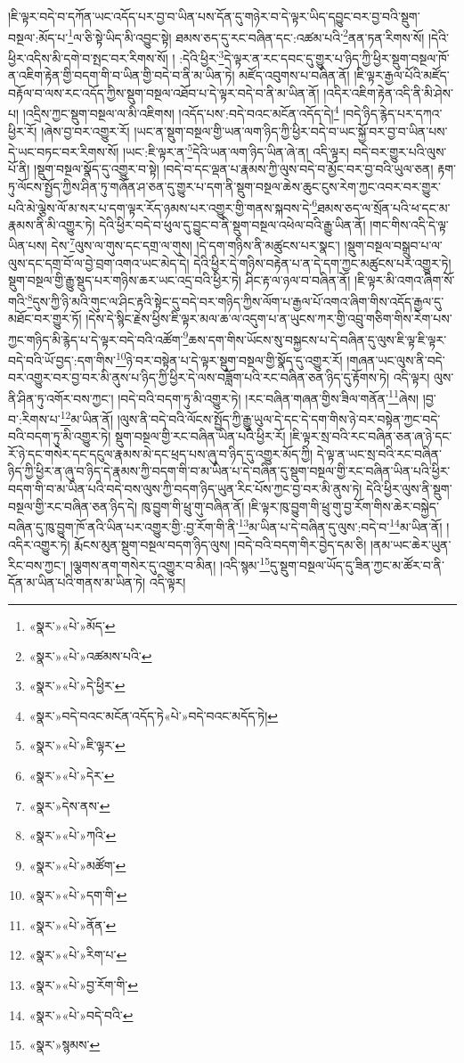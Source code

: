 །ཇི་ལྟར་བདེ་བ་དཀོན་ཡང་འདོད་པར་བྱ་བ་ཡིན་པས་དོན་དུ་གཉེར་བ་དེ་ལྟར་ཡིད་དབྱུང་བར་བྱ་བའི་སྡུག་བསྔལ་:མོད་པ་\footnote{«སྣར་»«པེ་»མོད་}ལ་ཅི་སྟེ་ཡིད་མི་འབྱུང་སྟེ། ཐམས་ཅད་དུ་རང་བཞིན་དང་:འཚམ་པའི་\footnote{«སྣར་»«པེ་»འཚམས་པའི་}ནན་ཏན་རིགས་སོ། །དེའི་ཕྱིར་འདིས་མི་དགེ་བ་སྤང་བར་རིགས་སོ། །
:དེའི་ཕྱིར་\footnote{«སྣར་»«པེ་»དེ་ཕྱིར་}དེ་ལྟར་ན་རང་དབང་དུ་གྱུར་པ་ཉིད་ཀྱི་ཕྱིར་སྡུག་བསྔལ་ཁོ་ན་འཇིག་རྟེན་གྱི་བདག་གི་བ་ཡིན་གྱི་བདེ་བ་ནི་མ་ཡིན་ཏེ། མཛོད་འབུགས་པ་བཞིན་ནོ། །ཇི་ལྟར་རྒྱལ་པོའི་མཛོད་བརྟོལ་བ་ལས་རང་འདོད་ཀྱིས་སྡུག་བསྔལ་འཐོབ་པ་དེ་ལྟར་བདེ་བ་ནི་མ་ཡིན་ནོ། །འདིར་འཇིག་རྟེན་འདི་ནི་མི་ཤེས་པ། །འདྲིས་ཀྱང་སྡུག་བསྔལ་ལ་མི་འཇིགས། །འདོད་པས་:བདེ་བའང་མངོན་འདོད་དེ།\footnote{«སྣར་»བདེ་བའང་མངོན་འདོད་ཏེ«པེ་»བདེ་བའང་མདོད་ཏེ།} །བདེ་ཉིད་རྙེད་པར་དཀའ་ཕྱིར་རོ། །ཞེས་བྱ་བར་འགྱུར་རོ། །ཡང་ན་སྡུག་བསྔལ་གྱི་ཡན་ལག་ཉིད་ཀྱི་ཕྱིར་བདེ་བ་ཡང་སྐྱོ་བར་བྱ་བ་ཡིན་པས་དེ་ཡང་བཏང་བར་རིགས་སོ། །ཡང་:ཇི་ལྟར་ན་\footnote{«སྣར་»«པེ་»ཇི་ལྟར་}དེའི་ཡན་ལག་ཉིད་ཡིན་ཞེ་ན། འདི་ལྟར། བདེ་བར་གྱུར་པའི་ལུས་པོ་ནི། །སྡུག་བསྔལ་སྣོད་དུ་འགྱུར་བ་སྟེ། །བདེ་བ་དང་ལྡན་པ་རྣམས་ཀྱི་ལུས་བདེ་བ་མྱོང་བར་བྱ་བའི་ཡུལ་ཅན། རྟག་ཏུ་ལོངས་སྤྱོད་ཀྱིས་ཤིན་ཏུ་གཞོན་ཤ་ཅན་དུ་གྱུར་པ་དག་ནི་སྡུག་བསྔལ་ཆེས་ཆུང་ངུས་རེག་ཀྱང་འབར་བར་གྱུར་པའི་མེ་ལྕེས་ལོ་མ་སར་པ་དག་ལྟར་རོད་ཉམས་པར་འགྱུར་གྱི་གནས་སྐབས་དེ་\footnote{«སྣར་»«པེ་»དེར་}ཐམས་ཅད་ལ་སྲོན་པའི་ཕ་དང་མ་རྣམས་ནི་མི་འགྱུར་ཏེ། དེའི་ཕྱིར་བདེ་བ་ཕུལ་དུ་བྱུང་བ་ནི་སྡུག་བསྔལ་འཕེལ་བའི་རྒྱུ་ཡིན་ནོ། །གང་གིས་འདི་དེ་ལྟ་ཡིན་པས། དེས་\footnote{«སྣར་»དེས་ནས་}ལུས་ལ་གུས་དང་དགྲ་ལ་གུས། །དེ་དག་གཉིས་ནི་མཚུངས་པར་སྣང་། །སྡུག་བསྔལ་བསྒྲུབ་པ་ལ་ལུས་དང་དགྲ་བོ་ལ་བྱེ་བྲག་འགའ་ཡང་མེད་དེ། དེའི་ཕྱིར་དེ་གཉིས་བརྟེན་པ་ན་དེ་དག་ཀྱང་མཚུངས་པར་འགྱུར་ཏེ། སྡུག་བསྔལ་གྱི་རྒྱུ་སྡུད་པར་གཉིས་ཆར་ཡང་འདྲ་བའི་ཕྱིར་ཏེ། ཤིང་རྟ་ལ་ཉལ་བ་བཞིན་ནོ། །ཇི་ལྟར་མི་འགའ་ཞིག་སོ་གའི་\footnote{«སྣར་»«པེ་»ཀའི་}དུས་ཀྱི་ཉི་མའི་གུང་ལ་ཤིང་རྟའི་སྟེང་དུ་བདེ་བར་གཉིད་ཀྱིས་ལོག་པ་རྒྱལ་པོ་འགའ་ཞིག་གིས་འདོད་རྒྱལ་དུ་མཐོང་བར་གྱུར་ཏོ། །དེས་དེ་སྙིང་རྗེས་ཕྱིས་ཇི་ལྟར་མལ་ཆ་ལ་འདུག་པ་ན་ཡུངས་ཀར་གྱི་འབྲུ་གཅིག་གིས་རེག་པས་ཀྱང་གཉིད་མི་རྙེད་པ་དེ་ལྟར་བདེ་བའི་འཚོག་\footnote{«སྣར་»«པེ་»མཚོག་}ཆས་དག་གིས་ཡོངས་སུ་བསྐྱངས་པ་དེ་བཞིན་དུ་ལུས་ཇི་ལྟ་ཇི་ལྟར་བདེ་བའི་ཡོ་བྱད་:དག་གིས་\footnote{«སྣར་»«པེ་»དག་གི་}ཉེ་བར་བསྟེན་པ་དེ་ལྟར་སྡུག་བསྔལ་གྱི་སྣོད་དུ་འགྱུར་རོ། །གཞན་ཡང་ལུས་ནི་བདེ་བར་འགྱུར་བར་བྱ་བར་མི་ནུས་པ་ཉིད་ཀྱི་ཕྱིར་དེ་ལས་བཟློག་པའི་རང་བཞིན་ཅན་ཉིད་དུ་རྟོགས་ཏེ། འདི་ལྟར། ལུས་ནི་ཤིན་ཏུ་འགོར་བས་ཀྱང་། །བདེ་བའི་བདག་ཏུ་མི་འགྱུར་ཏེ། །རང་བཞིན་གཞན་གྱིས་ཟིལ་གནོན་\footnote{«སྣར་»«པེ་»ནོན་}ཞེས། །བྱ་བ་:རིགས་པ་\footnote{«སྣར་»«པེ་»རིག་པ་}མ་ཡིན་ནོ། །ལུས་ནི་བདེ་བའི་ལོངས་སྤྱོད་ཀྱི་རྒྱུ་ཡུལ་དེ་དང་དེ་དག་གིས་ཉེ་བར་བསྟེན་ཀྱང་བདེ་བའི་བདག་ཏུ་མི་འགྱུར་ཏེ། སྡུག་བསྔལ་གྱི་རང་བཞིན་ཡིན་པའི་ཕྱིར་རོ། །ཇི་ལྟར་སྲ་བའི་རང་བཞིན་ཅན་ཞ་ཉེ་དང་རོ་ཉེ་དང་གསེར་དང་དངུལ་རྣམས་མེ་དང་ཕྲད་པས་ཞུ་བ་ཉིད་དུ་འགྱུར་མོད་ཀྱི། དེ་ལྟ་ན་ཡང་སྲ་བའི་རང་བཞིན་ཉིད་ཀྱི་ཕྱིར་ན་ཞུ་བ་ཉིད་དེ་རྣམས་ཀྱི་བདག་གི་བ་མ་ཡིན་པ་དེ་བཞིན་དུ་སྡུག་བསྔལ་གྱི་རང་བཞིན་ཡིན་པའི་ཕྱིར་བདག་གི་བ་མ་ཡིན་པའི་བདེ་བས་ལུས་ཀྱི་བདག་ཉིད་ཡུན་རིང་པོས་ཀྱང་བྱ་བར་མི་ནུས་ཏེ། དེའི་ཕྱིར་ལུས་ནི་སྡུག་བསྔལ་གྱི་རང་བཞིན་ཅན་ཉིད་དེ། ཁུ་བྱུག་གི་ཕྲུ་གུ་བཞིན་ནོ། །ཇི་ལྟར་ཁུ་བྱུག་གི་ཕྲུ་གུ་བྱ་རོག་གིས་ཆེར་བསྐྱེད་བཞིན་དུ་ཁུ་བྱུག་ཁོ་ནའི་ཡིན་པར་འགྱུར་གྱི་:བྱ་རོག་གི་ནི་\footnote{«སྣར་»«པེ་»བྱ་རོག་གི་}མ་ཡིན་པ་དེ་བཞིན་དུ་ལུས་:བདེ་བ་\footnote{«སྣར་»«པེ་»བདེ་བའི་}མ་ཡིན་ནོ། །འདིར་འགྱུར་ཏེ། རྨོངས་མུན་སྡུག་བསྔལ་བདག་ཉིད་ལུས། །བདེ་བའི་བདག་གིར་བྱེད་དམ་ཅི། །ནམ་ཡང་ཆེར་ཡུན་རིང་བས་ཀྱང་། །ལྕགས་ནག་གསེར་དུ་འགྱུར་བ་མིན། །འདི་སྙམ་\footnote{«སྣར་»སྙམས་}དུ་སྡུག་བསྔལ་ཡོད་དུ་ཟིན་ཀྱང་མ་ཚོར་བ་ནི་དོན་མ་ཡིན་པའི་གནས་མ་ཡིན་ཏེ། འདི་ལྟར། 